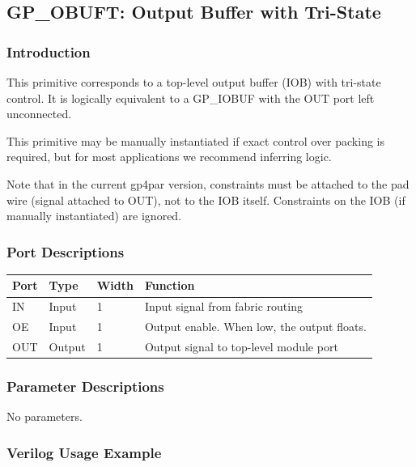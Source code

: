 \documentclass[11pt]{article}
\begin{document}

\pagebreak
\subsection{GP\_OBUFT: Output Buffer with Tri-State}

\subsubsection{Introduction}
This primitive corresponds to a top-level output buffer (IOB) with tri-state control. It is logically equivalent to a 
GP\_IOBUF with the OUT port left unconnected.

This primitive may be manually instantiated if exact control over packing is required, but for most applications we 
recommend inferring logic.

Note that in the current gp4par version, constraints must be attached to the pad wire (signal attached to OUT), not 
to the IOB itself. Constraints on the IOB (if manually instantiated) are ignored.

\subsubsection{Port Descriptions}

\begin{tabularx}{4in}{|l|l|l|X|}
\hline
{\bfseries Port} & {\bfseries Type} & {\bfseries Width} & {\bfseries Function} \\
\hline
IN & Input & 1 & Input signal from fabric routing \\
\hline
OE & Input & 1 & Output enable. When low, the output floats. \\
\hline
OUT & Output & 1 & Output signal to top-level module port \\
\hline
\end{tabularx}

\subsubsection{Parameter Descriptions}

No parameters.

\subsubsection{Verilog Usage Example}
\end{document}
